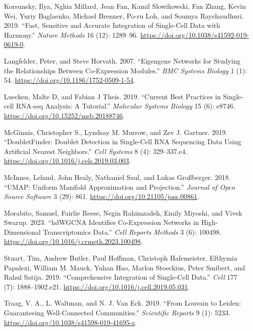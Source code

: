 \documentclass[
  letterpaper,
  DIV=11,
  numbers=noendperiod]{scrartcl}
\newlength{\cslhangindent}
\newenvironment{CSLReferences}[2] %
 {\begin{list}{}{%
  \setlength{\itemindent}{0pt}
  \setlength{\leftmargin}{0pt}
  \setlength{\parsep}{0pt}
  \ifodd #1
   \setlength{\leftmargin}{\cslhangindent}
   \setlength{\itemindent}{-1\cslhangindent}
  \fi
  \setlength{\itemsep}{#2\baselineskip}}}
 {\end{list}}
\begin{document}
\begin{CSLReferences}{1}{0}
Korsunsky, Ilya, Nghia Millard, Jean Fan, Kamil Slowikowski, Fan Zhang,
Kevin Wei, Yuriy Baglaenko, Michael Brenner, Po-ru Loh, and Soumya
Raychaudhuri. 2019. {``Fast, Sensitive and Accurate Integration of
Single-Cell Data with {Harmony}.''} \emph{Nature Methods} 16 (12):
1289--96. \url{https://doi.org/10.1038/s41592-019-0619-0}.

Langfelder, Peter, and Steve Horvath. 2007. {``Eigengene Networks for
Studying the Relationships Between Co-Expression Modules.''} \emph{BMC
Systems Biology} 1 (1): 54.
\url{https://doi.org/10.1186/1752-0509-1-54}.

Luecken, Malte D, and Fabian J Theis. 2019. {``Current Best Practices in
Single‐cell {RNA}‐seq Analysis: A Tutorial.''} \emph{Molecular Systems
Biology} 15 (6): e8746. \url{https://doi.org/10.15252/msb.20188746}.

McGinnis, Christopher S., Lyndsay M. Murrow, and Zev J. Gartner. 2019.
{``{DoubletFinder}: {Doublet} {Detection} in {Single}-{Cell} {RNA}
{Sequencing} {Data} {Using} {Artificial} {Nearest} {Neighbors}.''}
\emph{Cell Systems} 8 (4): 329--337.e4.
\url{https://doi.org/10.1016/j.cels.2019.03.003}.

McInnes, Leland, John Healy, Nathaniel Saul, and Lukas Großberger. 2018.
{``{UMAP}: {Uniform} {Manifold} {Approximation} and {Projection}.''}
\emph{Journal of Open Source Software} 3 (29): 861.
\url{https://doi.org/10.21105/joss.00861}.

Morabito, Samuel, Fairlie Reese, Negin Rahimzadeh, Emily Miyoshi, and
Vivek Swarup. 2023. {``{hdWGCNA} Identifies Co-Expression Networks in
High-Dimensional Transcriptomics Data.''} \emph{Cell Reports Methods} 3
(6): 100498. \url{https://doi.org/10.1016/j.crmeth.2023.100498}.

Stuart, Tim, Andrew Butler, Paul Hoffman, Christoph Hafemeister,
Efthymia Papalexi, William M. Mauck, Yuhan Hao, Marlon Stoeckius, Peter
Smibert, and Rahul Satija. 2019. {``Comprehensive {Integration} of
{Single}-{Cell} {Data}.''} \emph{Cell} 177 (7): 1888--1902.e21.
\url{https://doi.org/10.1016/j.cell.2019.05.031}.

Traag, V. A., L. Waltman, and N. J. Van Eck. 2019. {``From {Louvain} to
{Leiden}: Guaranteeing Well-Connected Communities.''} \emph{Scientific
Reports} 9 (1): 5233. \url{https://doi.org/10.1038/s41598-019-41695-z}.


\end{CSLReferences}
\end{document}
